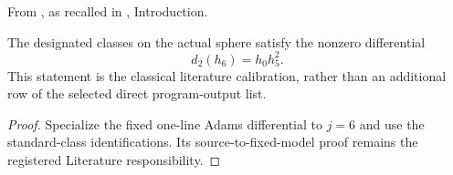 \begin{theorem}
\label{sem:AdamsComputation:d2-h6-calibration}
From \cite{Adams60}, as recalled in \cite{LWX126}, Introduction.\par
The designated classes on the actual sphere satisfy the nonzero differential
\[
d_2(h_6)=h_0h_5^2.
\]
This statement is the classical literature calibration, rather than an
additional row of the selected direct program-output list.
\end{theorem}
\begin{proof}
Specialize the fixed one-line Adams differential to $j=6$ and use the
standard-class identifications. Its source-to-fixed-model proof remains
the registered Literature responsibility.
\end{proof}
